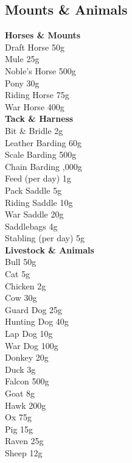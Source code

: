 \documentclass[10pt,twoside]{article}
\begin{document}
\subsection{Mounts \& Animals}

\begin{multicols}{2}
\textbf{Horses \& Mounts} \\
Draft Horse \dotfill 50g \\
Mule \dotfill 25g \\
Noble's Horse \dotfill 500g \\
Pony \dotfill 30g \\
Riding Horse \dotfill 75g \\
War Horse \dotfill 400g \\

\textbf{Tack \& Harness} \\
Bit \& Bridle \dotfill 2g \\
Leather Barding \dotfill 60g \\
Scale Barding \dotfill 500g \\
Chain Barding ,000g \\
Feed (per day) \dotfill 1g \\
Pack Saddle \dotfill 5g \\
Riding Saddle \dotfill 10g \\
War Saddle \dotfill 20g \\
Saddlebags \dotfill 4g \\
Stabling (per day) \dotfill 5g \\

\textbf{Livestock \& Animals} \\
Bull \dotfill 50g \\
Cat \dotfill 5g \\
Chicken \dotfill 2g \\
Cow \dotfill 30g \\
Guard Dog \dotfill 25g \\
Hunting Dog \dotfill 40g \\
Lap Dog \dotfill 10g \\
War Dog \dotfill 100g \\
Donkey \dotfill 20g \\
Duck \dotfill 3g \\
Falcon \dotfill 500g \\
Goat \dotfill 8g \\
Hawk \dotfill 200g \\
Ox \dotfill 75g \\
Pig \dotfill 15g \\
Raven \dotfill 25g \\
Sheep \dotfill 12g \\
\end{multicols}
\end{document}
